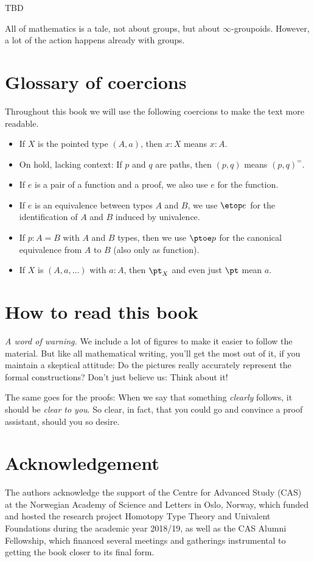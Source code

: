 %

TBD

All of mathematics is a tale, not about groups,
but about $\infty$-groupoids.
However, a lot of the action happens already with groups.

\section*{Glossary of coercions}

Throughout this book we will use the following coercions to make the text more readable.
\begin{itemize}[noitemsep]
\item If $X$ is the pointed type $(A,a)$, then $x:X$ means $x:A$.
\item On hold, lacking context: If $p$ and $q$ are paths, then $(p,q)$ means $(p,q)^=$.
\item If $e$ is a pair of a function and a proof, we also use $e$ for the function.
\item If $e$ is an equivalence between types $A$ and $B$, we use $\etop e$ for the
identification of $A$ and $B$ induced by univalence.
\item If $p: A= B$ with $A$ and $B$ types, then we use $\ptoe p$ for the canonical
equivalence from $A$ to $B$ (also only as function).
\item If $X$ is $(A,a,\ldots)$ with $a:A$, then $\pt_X$ and even just $\pt$ mean $a$.
\end{itemize}

\section*{How to read this book}

\noindent\emph{A word of warning.}\enspace
We include a lot of figures to make it easier to follow the material.
But like all mathematical writing, you'll get the most out of it,
if you maintain a skeptical attitude:
Do the pictures really accurately represent the formal constructions?
Don't just believe us: Think about it!

The same goes for the proofs: When we say that something \emph{clearly} follows,
it should be \emph{clear to you}.
So clear, in fact, that you could go and convince a proof assistant,
should you so desire.

\section*{Acknowledgement}

The authors acknowledge the support of the Centre for Advanced Study (CAS)
at the Norwegian Academy of Science and Letters
in Oslo, Norway, which funded and hosted the research project Homotopy
Type Theory and Univalent Foundations during the academic year 2018/19,
as well as the CAS Alumni Fellowship, which financed several meetings and gatherings instrumental to getting the book closer to its final form.

